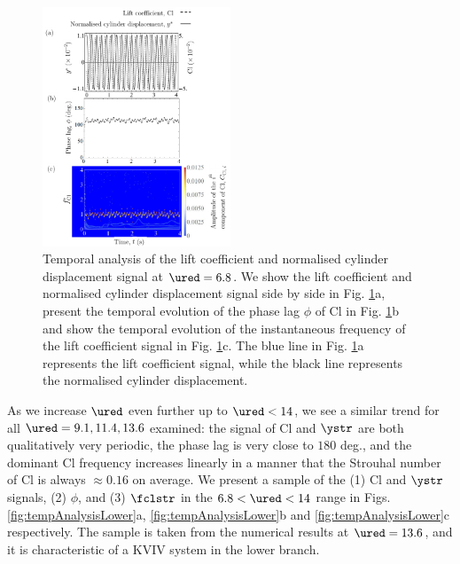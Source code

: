 \documentclass[a4paper,fleqn]{cas-sc}
\begin{document}
\begin{figure}
  \centering
  \includegraphics[width=0.5\textwidth]{figs/figure13}
  \caption{Temporal analysis of the lift coefficient and normalised cylinder displacement signal at $\ured = 6.8$. We show the lift coefficient and normalised cylinder displacement signal side by side in Fig. \ref{fig:tempAnalysisUpper}a, present the temporal evolution of the phase lag $\phi$ of Cl in Fig. \ref{fig:tempAnalysisUpper}b and show the temporal evolution of the instantaneous frequency of the lift coefficient signal in Fig. \ref{fig:tempAnalysisUpper}c. The blue line in Fig. \ref{fig:tempAnalysisUpper}a represents the lift coefficient signal, while the black line represents the normalised cylinder displacement.} \label{fig:tempAnalysisUpper}
\end{figure}

As we increase $\ured$ even further up to $\ured < 14$, we see a similar trend for all $\ured = 9.1, 11.4, 13.6$ examined: the signal of Cl and $\ystr$ are both qualitatively very periodic, the phase lag is very close to $180$ deg., and the dominant Cl frequency increases linearly in a manner that the Strouhal number of Cl is always $\approx 0.16$ on average. We present a sample of the (1) Cl and  $\ystr$ signals, (2) $\phi$, and (3) $\fclstr$ in the $6.8 < \ured < 14$ range in Figs. \ref{fig:tempAnalysisLower}a, \ref{fig:tempAnalysisLower}b and \ref{fig:tempAnalysisLower}c respectively. The sample is taken from the numerical results at $\ured = 13.6$, and it is characteristic of a KVIV system in the lower branch.
\end{document}
